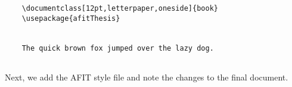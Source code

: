     {\singlespace	
    \begin{verbatim}
    \documentclass[12pt,letterpaper,oneside]{book}
    \usepackage{afitThesis}

    
    The quick brown fox jumped over the lazy dog.
    
    \end{verbatim}
    }

    Next, we add the AFIT style file and note the changes to the final document.  

